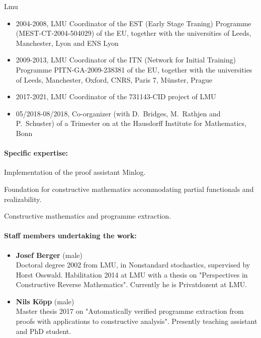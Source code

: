 \begin{sitedescription}{Lmu}
\begin{itemize}
\item 2004-2008, LMU Coordinator of the  EST (Early Stage Traning) Programme
   (MEST-CT-2004-504029) of the EU, together with the
universities of Leeds, Manchester, Lyon and ENS Lyon

\item 2009-2013, LMU Coordinator of the ITN (Network for Initial
    Training) Programme PITN-GA-2009-238381  of the
    EU, together with the universities of Leeds, Manchester, Oxford,
    CNRS, Paris 7, M\"unster, Prague

\item 2017-2021, LMU Coordinator of the 731143-CID project of LMU

\item 05/2018-08/2018, Co-organizer (with D.~Bridges, M.~Rathjen and
  P.~Schuster) of a Trimester on 
  at the Hausdorff Institute for Mathematics, Bonn
\end{itemize}
\paragraph{Specific expertise:}
\begin{compactitem}
\item Implementation of the proof assistant Minlog.
\item Foundation for constructive mathematics accommodating partial functionals and realizability.
\item Constructive mathematics and programme extraction.
\end{compactitem}

\paragraph{Staff members undertaking the work:}

\begin{itemize}

\item \textbf{Josef Berger} (male)\\
Doctoral degree 2002 from LMU, in Nonstandard
stochastics, supervised by Horst Osswald.  Habilitation 2014 at LMU
with a thesis on "Perspectives in Constructive Reverse Mathematics".
Currently he is Privatdozent at LMU.

\item \textbf{Nils K\"opp} (male)\\
Master thesis 2017 on "Automatically verified programme
extraction from proofs with applications to constructive analysis".
Presently teaching assistant and PhD student.


\end{itemize}
\end{sitedescription}

